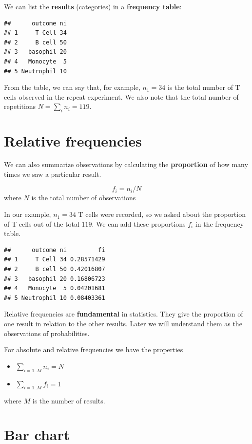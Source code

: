 \documentclass[
]{book}
\providecommand{\tightlist}{%
  \setlength{\itemsep}{0pt}\setlength{\parskip}{0pt}}
\begin{document}
We can list the \textbf{results} (categories) in a \textbf{frequency table}:

\begin{verbatim}
##      outcome ni
## 1     T Cell 34
## 2     B cell 50
## 3   basophil 20
## 4   Monocyte  5
## 5 Neutrophil 10
\end{verbatim}

From the table, we can say that, for example, \(n_1=34\) is the total number of T cells observed in the repeat experiment. We also note that the total number of repetitions \(N=\sum_i n_i = 119\).

\hypertarget{relative-frequencies}{%
\section{Relative frequencies}\label{relative-frequencies}}

We can also summarize observations by calculating the \textbf{proportion} of how many times we saw a particular result.

\[ f_i = n_i /N\] where \(N\) is the total number of observations

In our example, \(n_1=34\) T cells were recorded, so we asked about the proportion of T cells out of the total \(119\). We can add these proportions \(f_i\) in the frequency table.

\begin{verbatim}
##      outcome ni         fi
## 1     T Cell 34 0.28571429
## 2     B cell 50 0.42016807
## 3   basophil 20 0.16806723
## 4   Monocyte  5 0.04201681
## 5 Neutrophil 10 0.08403361
\end{verbatim}

Relative frequencies are \textbf{fundamental} in statistics. They give the proportion of one result in relation to the other results. Later we will understand them as the observations of probabilities.

For absolute and relative frequencies we have the properties

\begin{itemize}
\tightlist
\item
  \(\sum_{i=1..M} n_i = N\)
\item
  \(\sum_{i=1..M} f_i = 1\)
\end{itemize}

where \(M\) is the number of results.

\hypertarget{bar-chart}{%
\section{Bar chart}\label{bar-chart}}
\end{document}

